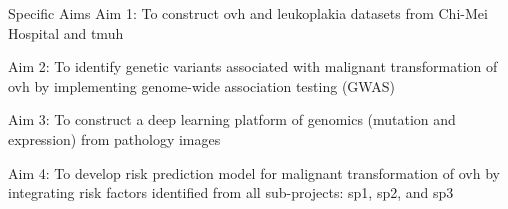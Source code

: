 \documentclass[12pt, a4paper]{article}
\newcommand{\cntext}[1]{\begin{CJK*}{UTF8}{bkai}#1\end{CJK*}}
\newcommand{\aimone}{To construct \acrshort{ovh} and leukoplakia datasets from Chi-Mei Hospital and \acrfull{tmuh}}
\newcommand{\aimtwo}{To identify genetic variants associated with malignant transformation of \acrshort{ovh} by implementing genome-wide association testing (GWAS)}
\newcommand{\aimthree}{To construct a deep learning platform of genomics (mutation and expression) from pathology images}
\newcommand{\aimfour}{To develop risk prediction model for malignant transformation of \acrshort{ovh} by integrating risk factors identified from all sub-projects: sp1, sp2, and sp3}
\begin{document}
\begin{outline}

Specific Aims %
\1 Aim 1: \aimone

\1 Aim 2: \aimtwo 


\1 Aim 3: \aimthree

\1 Aim 4: \aimfour

\end{outline}




%
\end{document}
